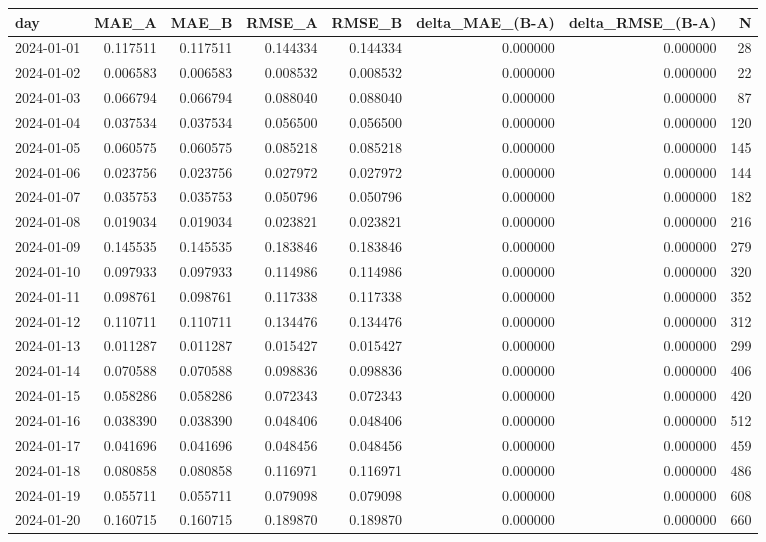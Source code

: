 \begin{tabular}{lrrrrrrr}
\toprule
day & MAE_A & MAE_B & RMSE_A & RMSE_B & delta_MAE_(B-A) & delta_RMSE_(B-A) & N \\
\midrule
2024-01-01 & 0.117511 & 0.117511 & 0.144334 & 0.144334 & 0.000000 & 0.000000 & 28 \\
2024-01-02 & 0.006583 & 0.006583 & 0.008532 & 0.008532 & 0.000000 & 0.000000 & 22 \\
2024-01-03 & 0.066794 & 0.066794 & 0.088040 & 0.088040 & 0.000000 & 0.000000 & 87 \\
2024-01-04 & 0.037534 & 0.037534 & 0.056500 & 0.056500 & 0.000000 & 0.000000 & 120 \\
2024-01-05 & 0.060575 & 0.060575 & 0.085218 & 0.085218 & 0.000000 & 0.000000 & 145 \\
2024-01-06 & 0.023756 & 0.023756 & 0.027972 & 0.027972 & 0.000000 & 0.000000 & 144 \\
2024-01-07 & 0.035753 & 0.035753 & 0.050796 & 0.050796 & 0.000000 & 0.000000 & 182 \\
2024-01-08 & 0.019034 & 0.019034 & 0.023821 & 0.023821 & 0.000000 & 0.000000 & 216 \\
2024-01-09 & 0.145535 & 0.145535 & 0.183846 & 0.183846 & 0.000000 & 0.000000 & 279 \\
2024-01-10 & 0.097933 & 0.097933 & 0.114986 & 0.114986 & 0.000000 & 0.000000 & 320 \\
2024-01-11 & 0.098761 & 0.098761 & 0.117338 & 0.117338 & 0.000000 & 0.000000 & 352 \\
2024-01-12 & 0.110711 & 0.110711 & 0.134476 & 0.134476 & 0.000000 & 0.000000 & 312 \\
2024-01-13 & 0.011287 & 0.011287 & 0.015427 & 0.015427 & 0.000000 & 0.000000 & 299 \\
2024-01-14 & 0.070588 & 0.070588 & 0.098836 & 0.098836 & 0.000000 & 0.000000 & 406 \\
2024-01-15 & 0.058286 & 0.058286 & 0.072343 & 0.072343 & 0.000000 & 0.000000 & 420 \\
2024-01-16 & 0.038390 & 0.038390 & 0.048406 & 0.048406 & 0.000000 & 0.000000 & 512 \\
2024-01-17 & 0.041696 & 0.041696 & 0.048456 & 0.048456 & 0.000000 & 0.000000 & 459 \\
2024-01-18 & 0.080858 & 0.080858 & 0.116971 & 0.116971 & 0.000000 & 0.000000 & 486 \\
2024-01-19 & 0.055711 & 0.055711 & 0.079098 & 0.079098 & 0.000000 & 0.000000 & 608 \\
2024-01-20 & 0.160715 & 0.160715 & 0.189870 & 0.189870 & 0.000000 & 0.000000 & 660 \\

\end{tabular}
